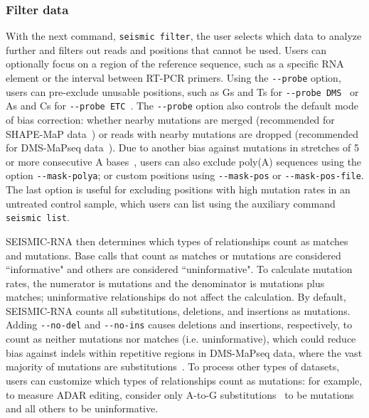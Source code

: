 \documentclass[unnumsec,webpdf,contemporary,large]{oup-authoring-template}%
\theoremstyle{thmstyleone}%
\theoremstyle{thmstyletwo}%
\theoremstyle{thmstylethree}%
\begin{document}
\subsubsection{Filter data}
\label{seismic-filter}

With the next command, \verb|seismic filter|, the user selects which data to analyze further and filters out reads and positions that cannot be used.
Users can optionally focus on a region of the reference sequence, such as a specific RNA element or the interval between RT-PCR primers.
Using the \verb|--probe| option, users can pre-exclude unusable positions, such as Gs and Ts for \verb|--probe DMS|~\cite{Zubradt2016} or As and Cs for \verb|--probe ETC|~\cite{Douds2024}.
The \verb|--probe| option also controls the default mode of bias correction: whether nearby mutations are merged (recommended for SHAPE-MaP data~\cite{Busan2018}) or reads with nearby mutations are dropped (recommended for DMS-MaPseq data~\cite{Tomezsko2020}).
Due to another bias against mutations in stretches of 5 or more consecutive A bases~\cite{Kladwang2020}, users can also exclude poly(A) sequences using the option \verb|--mask-polya|; or custom positions using \verb|--mask-pos| or \verb|--mask-pos-file|.
The last option is useful for excluding positions with high mutation rates in an untreated control sample, which users can list using the auxiliary command \verb|seismic list|.

SEISMIC-RNA then determines which types of relationships count as matches and mutations.
Base calls that count as matches or mutations are considered ``informative" and others are considered ``uninformative".
To calculate mutation rates, the numerator is mutations and the denominator is mutations plus matches; uninformative relationships do not affect the calculation.
By default, SEISMIC-RNA counts all substitutions, deletions, and insertions as mutations.
Adding \verb|--no-del| and \verb|--no-ins| causes deletions and insertions, respectively, to count as neither mutations nor matches (i.e. uninformative), which could reduce bias against indels within repetitive regions in DMS-MaPseq data, where the vast majority of mutations are substitutions~\cite{Zubradt2016}.
To process other types of datasets, users can customize which types of relationships count as mutations: for example, to measure ADAR editing, consider only A-to-G substitutions~\cite{Okada2019,Shin2026} to be mutations and all others to be uninformative.
\end{document}
